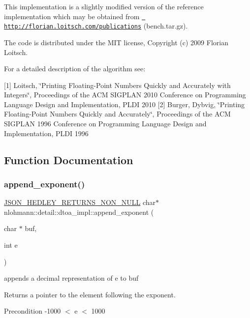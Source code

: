This implementation is a slightly modified version of the reference implementation which may be obtained from \href{http://florian.loitsch.com/publications}{\texttt{ http\+://florian.\+loitsch.\+com/publications}} (bench.\+tar.\+gz).

The code is distributed under the M\+IT license, Copyright (c) 2009 Florian Loitsch.

For a detailed description of the algorithm see\+:

\mbox{[}1\mbox{]} Loitsch, \char`\"{}\+Printing Floating-\/\+Point Numbers Quickly and Accurately with
    Integers\char`\"{}, Proceedings of the A\+CM S\+I\+G\+P\+L\+AN 2010 Conference on Programming Language Design and Implementation, P\+L\+DI 2010 \mbox{[}2\mbox{]} Burger, Dybvig, \char`\"{}\+Printing Floating-\/\+Point Numbers Quickly and Accurately\char`\"{}, Proceedings of the A\+CM S\+I\+G\+P\+L\+AN 1996 Conference on Programming Language Design and Implementation, P\+L\+DI 1996 

\subsection{Function Documentation}
\mbox{\label{namespacenlohmann_1_1detail_1_1dtoa__impl_ad90f19ed10d8133b727df4b9bc5ddf5c}} 
\subsubsection{\texorpdfstring{append\_exponent()}{append\_exponent()}}
{\footnotesize\ttfamily \mbox{\hyperlink{json_8hpp_a5f2aaec3b681d0a72f7d6e90b70cdcd1}{J\+S\+O\+N\+\_\+\+H\+E\+D\+L\+E\+Y\+\_\+\+R\+E\+T\+U\+R\+N\+S\+\_\+\+N\+O\+N\+\_\+\+N\+U\+LL}} char$\ast$ nlohmann\+::detail\+::dtoa\+\_\+impl\+::append\+\_\+exponent (\begin{DoxyParamCaption}\item[{char $\ast$}]{buf,  }\item[{int}]{e }\end{DoxyParamCaption})\hspace{0.3cm}{\ttfamily [inline]}}



appends a decimal representation of e to buf 

\begin{DoxyReturn}{Returns}
a pointer to the element following the exponent. 
\end{DoxyReturn}
\begin{DoxyPrecond}{Precondition}
-\/1000 $<$ e $<$ 1000 
\end{DoxyPrecond}
\mbox{\label{namespacenlohmann_1_1detail_1_1dtoa__impl_a22b6e37654ac93c6d0d9c06ec1bf5ded}} 
